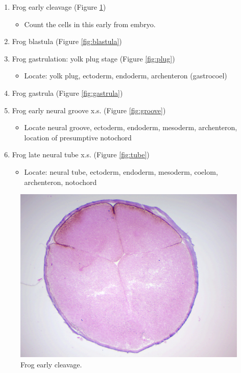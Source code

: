 \begin{enumerate}
\def\labelenumi{\arabic{enumi}.}
\tightlist
\item
  Frog early cleavage (Figure \ref{fig:cleavage})
\begin{itemize}
  \tightlist
  \item
  Count the cells in
  this early from embryo.
  \end{itemize}
\item
  Frog blastula (Figure \ref{fig:blastula})
\item
  Frog gastrulation: yolk plug stage (Figure \ref{fig:plug})
\begin{itemize}
  \tightlist
  \item
  Locate:
  yolk plug, ectoderm, endoderm, archenteron (gastrocoel)
\end{itemize}

\item
  Frog gastrula (Figure \ref{fig:gastrula})
\item
  Frog early neural groove x.s. (Figure \ref{fig:groove})

\begin{itemize}
\tightlist
  \item
  Locate
  neural groove, ectoderm, endoderm, mesoderm, archenteron, location of
  presumptive notochord
\end{itemize}

\item
  Frog late neural tube x.s. (Figure \ref{fig:tube})
\begin{itemize}
    \tightlist
  \item
  Locate: neural
  tube, ectoderm, endoderm, mesoderm, coelom, archenteron, notochord
\end{itemize}
\end{enumerate}

\begin{figure}

{\centering \includegraphics[width=0.7\linewidth]{./figures/development/frog_early_cleavage}

}

\caption{Frog early cleavage.}\label{fig:cleavage}
\end{figure}

